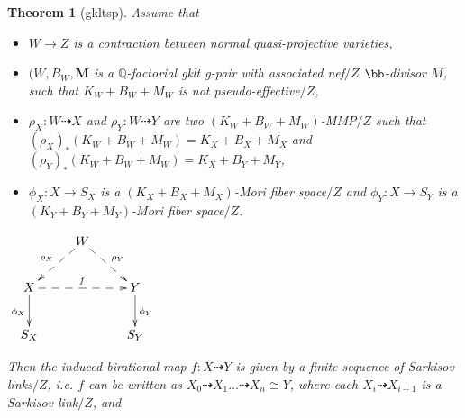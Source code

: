 \documentclass{article}
\newtheorem{thm}[defn]{Theorem}
\begin{document}
\begin{thm}[gkltsp]\label{thm: gkltsp}
  Assume that
  \begin{itemize}
    \item $W\rightarrow Z$ is a contraction between normal quasi-projective varieties,
    \item $(W,B_W,\mathbf{M}$ is a $\mathbb Q$-factorial gklt g-pair with associated nef$/Z$ $\bb$-divisor $M$, such that $K_W+B_W+M_W$ is not pseudo-effective$/Z$,
    \item $\rho_X: W\dashrightarrow X$ and $\rho_Y: W\dashrightarrow Y$ are two $(K_W+B_W+M_W)$-MMP$/Z$ such that $(\rho_X)_*(K_W+B_W+M_W)=K_X+B_X+M_X$ and $(\rho_Y)_*(K_W+B_W+M_W)=K_X+B_Y+M_Y$,
    \item $\phi_X: X\rightarrow S_X$ is a $(K_X+B_X+M_X)$-Mori fiber space$/Z$ and $\phi_Y: X\rightarrow S_Y$ is a $(K_Y+B_Y+M_Y)$-Mori fiber space$/Z$.
  \end{itemize}
  \begin{center}$\xymatrix{
        & W\ar@{-->}[dl]_{\rho_X}\ar@{-->}[dr]^{\rho_Y}& \\
        X \ar@{->}[d]_{\phi_X}\ar@{-->}[rr]^{f}   &  & Y\ar@{->}[d]^{\phi_Y} \\
        S_X & &S_Y }$
  \end{center}
  Then the induced birational map $f: X\dashrightarrow Y$ is given by a finite sequence of Sarkisov links$/Z$, i.e. $f$ can be written as $X_0\dashrightarrow X_1\dots\dashrightarrow X_n\cong Y$, where each $X_{i}\dashrightarrow X_{i+1}$ is a Sarkisov link$/Z$, and
\end{thm}
\end{document}

